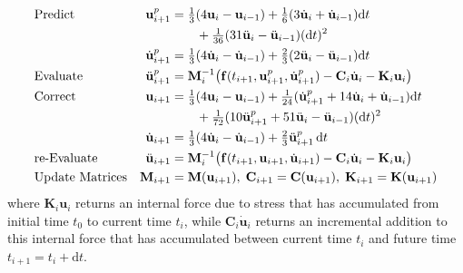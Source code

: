 \begin{subequations}
    \notag
    \begin{align}
    \mbox{} & \text{Predict} &
    \mathbf{u}_{i+1}^p & = \tfrac{1}{3} (
    4 \mathbf{u}_i - \mathbf{u}_{i-1} ) + 
    \tfrac{1}{6} ( 3 \dot{\mathbf{u}}_i + 
    \dot{\mathbf{u}}_{i-1} ) \mathrm{d}t \\ & & & \qquad + 
    \tfrac{1}{36} ( 31 \ddot{\mathbf{u}}_i - 
    \ddot{\mathbf{u}}_{i-1} ) ( \mathrm{d}t )^2 \\
    \mbox{} & &
    \dot{\mathbf{u}}_{i+1}^p & = \tfrac{1}{3} 
    ( 4 \dot{\mathbf{u}}_i - \dot{\mathbf{u}}_{i-1} ) + 
    \tfrac{2}{3} ( 2 \ddot{\mathbf{u}}_i - \ddot{\mathbf{u}}_{i-1} ) \mathrm{d}t \\
    \mbox{} & \text{Evaluate} &
    \ddot{\mathbf{u}}^p_{i+1} & = \mathbf{M}^{-1}_i \bigl( 
    \mathbf{f}(t_{i+1} , \mathbf{u}_{i+1}^p , \dot{\mathbf{u}}_{i+1}^p ) - 
    \mathbf{C}_i \dot{\mathbf{u}}_i - \mathbf{K}_i \mathbf{u}_i \bigr) \\
    \mbox{} & \text{Correct} & 
    \mathbf{u}_{i+1} & = \tfrac{1}{3} (
    4  \mathbf{u}_i - \mathbf{u}_{i-1} ) +
    \tfrac{1}{24} ( \dot{\mathbf{u}}^p_{i+1} +
    14 \dot{\mathbf{u}}_i + \dot{\mathbf{u}}_{i-1} ) \mathrm{d}t  \\
    \mbox{} & & & \qquad +
    \tfrac{1}{72} ( 10 \ddot{\mathbf{u}}^p_{i+1} + 
    51 \ddot{\mathbf{u}}_i - \ddot{\mathbf{u}}_{i-1} ) ( \mathrm{d}t )^2 \\ 
    \mbox{} & &
    \dot{\mathbf{u}}_{i+1} & = \tfrac{1}{3} 
    ( 4 \dot{\mathbf{u}}_i - \dot{\mathbf{u}}_{i-1} ) + 
    \tfrac{2}{3} \ddot{\mathbf{u}}^p_{i+1} \, \mathrm{d}t \\
    \mbox{} & \text{re-Evaluate} & 
    \ddot{\mathbf{u}}_{i+1} & = \mathbf{M}^{-1}_i \bigl( 
    \mathbf{f}( t_{i+1} , \mathbf{u}_{i+1} , \dot{\mathbf{u}}_{i+1} ) - 
    \mathbf{C}_i \dot{\mathbf{u}}_i - \mathbf{K}_i \mathbf{u}_i \bigr) \\
    \mbox{} & \text{Update Matrices} & 
    \mathbf{M}_{i+1} & = \mathbf{M} ( \mathbf{u}_{i+1} ) , \;
    \mathbf{C}_{i+1} = \mathbf{C} ( \mathbf{u}_{i+1} ) , \;
    \mathbf{K}_{i+1} = \mathbf{K} ( \mathbf{u}_{i+1} )
    \end{align}
\end{subequations}
where $\mathbf{K}_i \mathbf{u}_i$ returns an internal force due to stress that has accumulated from initial time $t_0$ to current time $t_i$, while $\mathbf{C}_i \dot{\mathbf{u}}_i$ returns an incremental addition to this internal force that has accumulated between current time $t_i$ and future time $t_{i+1} = t_i + \mathrm{d}t$.

